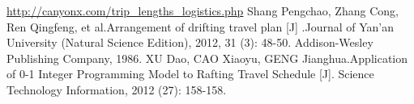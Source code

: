 
\begin{thebibliography}{99}
		
	\url{http://canyonx.com/trip_lengths_logistics.php}
	Shang Pengchao, Zhang Cong, Ren Qingfeng, et al.Arrangement of drifting travel plan [J] .Journal of Yan'an University (Natural Science Edition), 2012, 31 (3): 48-50.
	Addison-Wesley Publishing Company, 1986.
	XU Dao, CAO Xiaoyu, GENG Jianghua.Application of 0-1 Integer Programming Model to Rafting Travel Schedule [J]. Science Technology Information, 2012 (27): 158-158.
\end{thebibliography}